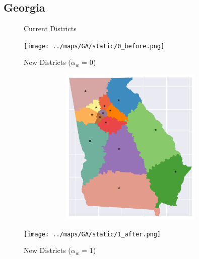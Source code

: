 \subsection{Georgia}
\begin{figure}[htb!] \centering
\caption{ Current Districts }
\texttt{[image: ../maps/GA/static/0\_before.png]}
\caption{ New Districts ($\alpha_w$ = 0) }
\includegraphics[width=5in,height=3in,keepaspectratio]{../maps/GA/static/0_after.png}
\caption{ New Districts ($\alpha_w$ = 1) }
\texttt{[image: ../maps/GA/static/1\_after.png]}
\end{figure}

\clearpage
\newpage


